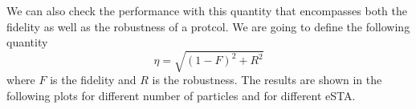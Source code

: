 We can also check the performance with this quantity that encompasses both the fidelity as well as the robustness of a protcol.
We are going to define the following quantity
\begin{equation}
	\eta = \sqrt{(1-F)^{2} + R^{2}}
	\label{eq:Sensitivity}
\end{equation}
where $F$ is the fidelity and $ R $  is the robustness.
The results are shown in the following plots for different number of particles and for different eSTA.

